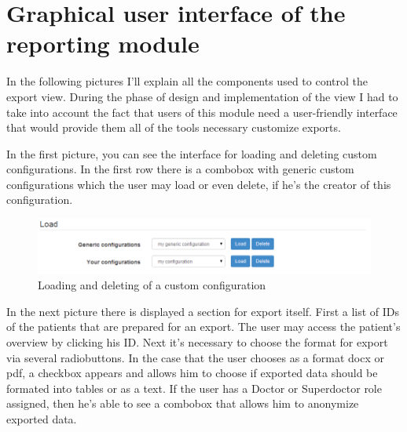 \documentclass[thesis=B,english]{FITthesis}[2012/10/20]
\begin{document}
\section{Graphical user interface of the reporting module}
In the following pictures I'll explain all the components used to control the export view. During the phase of design and implementation of the view I had to take into account the fact that users of this module need a user-friendly interface that would provide them all of the tools necessary customize exports.

In the first picture, you can see the interface for loading and deleting custom configurations. In the first row there is a combobox with generic custom configurations which the user may load or even delete, if he's the creator of this configuration.

\begin{figure}
	\centering
 	\includegraphics[width=1\textwidth]{images/load.png}
 	\caption{Loading and deleting of a custom configuration}
 	\label{fig:load}
\end{figure}


In the next picture there is displayed a section for export itself. First a list of IDs of the patients that are prepared for an export. The user may access the patient's overview by clicking his ID. Next it's necessary to choose the format for export via several radiobuttons. In the case that the user chooses as a format docx or pdf, a checkbox appears and allows him to choose if exported data should be formated into tables or as a text. If the user has a Doctor or Superdoctor role assigned, then he's able to see a combobox that allows him to anonymize exported data.
\end{document}
